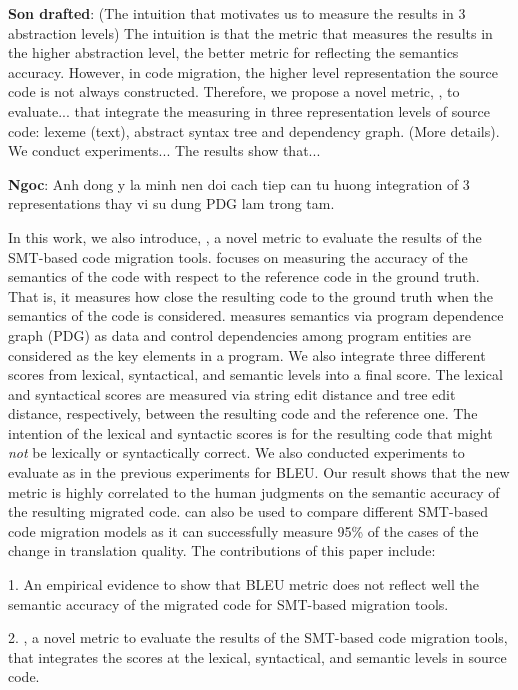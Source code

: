 \textbf{Son drafted}: (The intuition that motivates us to measure the results in 3 abstraction levels)
The intuition is that the metric that measures the results 
in the higher abstraction level, the better metric for reflecting the semantics 
accuracy. However, in code migration, the higher level representation the source 
code is not always constructed. Therefore, we propose a novel metric, {\model}, to evaluate...
 that integrate the measuring in three representation levels of source code: lexeme 
(text), abstract syntax tree and dependency graph. (More details). We conduct experiments... The results show that...

\textbf{Ngoc}: Anh dong y la minh nen doi cach tiep can tu huong integration of 3 representations thay vi su dung PDG lam trong tam.

In this work, we also introduce, {\model}, a novel metric to evaluate
the results of the SMT-based code migration tools. {\model} focuses on
measuring the accuracy of the semantics of the code with respect to
the reference code in the ground truth. That is, it measures how close
the resulting code to the ground truth when the semantics of the code
is considered. {\model} measures semantics via program dependence
graph (PDG) as data and control dependencies among program entities
are considered as the key elements in a program. We also integrate
three different scores from lexical, syntactical, and semantic levels
into a final {\model} score. The lexical and syntactical scores are
measured via string edit distance and tree edit distance,
respectively, between the resulting code and the reference one. The
intention of the lexical and syntactic scores is for the resulting
code that might {\em not} be lexically or syntactically correct. We
also conducted experiments to evaluate {\model} as in the previous
experiments for BLEU. Our result shows that the new metric {\model} is
highly correlated to the human judgments on the semantic accuracy of
the resulting migrated code. {\model} can also be used to compare
different SMT-based code migration models as it can successfully
measure 95\% of the cases of the change in translation quality. The
contributions of this paper include:

1. An empirical evidence to show that BLEU metric does not reflect
well the semantic accuracy of the migrated code for SMT-based
migration tools.

2. {\model}, a novel metric to evaluate the results of the SMT-based
code migration tools, that integrates the scores at the lexical,
syntactical, and semantic levels in source code.

